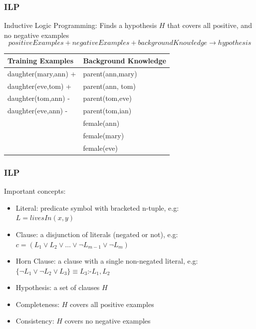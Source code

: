 \documentclass{beamer}
\begin{document}
\begin{frame}
\frametitle{ILP}
 Inductive Logic Programming: Finds a hypothesis $H$ that covers all positive, and no negative examples
  \begin{equation}
   positiveExamples + negativeExamples + background Knowledge \rightarrow hypothesis
  \end{equation}

\begin{table}
\begin{tabular}{| l | l |}
\toprule
\textbf{Training Examples} & \textbf{Background Knowledge}\\
\midrule
daughter(mary,ann) +	& parent(ann,mary)	\\
daughter(eve,tom) +	& parent(ann, tom)	\\
daughter(tom,ann) - 	& parent(tom,eve)	\\
daughter(eve,ann) -	& parent(tom,ian) 	\\
			& female(ann)		\\
			& female(mary)		\\
			& female(eve)		\\
\bottomrule
\end{tabular}
\end{table}
\end{frame}

\begin{frame}
\frametitle{ILP}
Important concepts:
  \begin{itemize}
   \item Literal: predicate symbol with bracketed n-tuple, e.g: \\ \quad $L=livesIn(x,y)$
   \item Clause: a disjunction of literals (negated or not), e.g: \\ \quad $c=(L_1 \vee L_2 \vee \ldots \vee \neg
L_{m-1} \vee \neg L_{m})$
   \item Horn Clause: a clause with a single non-negated literal, e.g: \\ \quad$\{\neg L_1 \vee \neg L_2 \vee L_3\}
\equiv L_3$:-$L_1,L_2$
   \item Hypothesis: a set of clauses $H$
   \item Completeness: $H$ covers all positive examples
   \item Consistency: $H$ covers no negative examples
  \end{itemize}
\end{frame}
\end{document}
